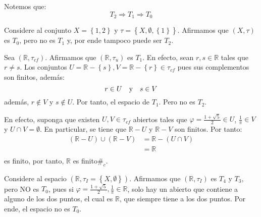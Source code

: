 \documentclass[12pt]{report}
\theoremstyle{largebreak}
\newcommand\contradiction{\ensuremath{\#_c}}
\begin{document}
    \begin{obs}
        Notemos que:
        \begin{equation*}
            T_2\Rightarrow T_1\Rightarrow T_0
        \end{equation*}
    \end{obs}

    \begin{exa}
        Considere al conjunto $X=\left\{1,2 \right\}$ y $\tau=\left\{X,\emptyset,\left\{1 \right\} \right\}$. Afirmamos que $(X,\tau)$ es $T_0$, pero no es $T_1$ y, por ende tampoco puede ser $T_2$.
    \end{exa}

    
    \begin{exa}
        Sea $(\mathbb{R},\tau_{cf})$. Afirmamos que $(\mathbb{R},\tau_u)$ es $T_1$. En efecto, sean $r,s\in\mathbb{R}$ tales que $r\neq s$. Los conjuntos $U=\mathbb{R}-\left\{s \right\},V=\mathbb{R}-\left\{r \right\}\in\tau_{cf}$ pues sus complementos son finitos, además:
        \begin{equation*}
            r\in U\quad\textup{y}\quad s\in V
        \end{equation*}
        además, $r\notin V$ y $s\notin U$. Por tanto, el espacio de $T_1$. Pero no es $T_2$.

        En efecto, suponga que existen $U,V\in\tau_{cf}$ abiertos tales que $\varphi=\frac{1+\sqrt{5}}{2}\in U$, $\frac{1}{\pi}\in V$ y $U\cap V=\emptyset$. En particular, se tiene que $\mathbb{R}-U$ y $\mathbb{R}-V$ son finitos. Por tanto:
        \begin{equation*}
            \begin{split}
                (\mathbb{R}-U)\cup(\mathbb{R}-V)&=\mathbb{R}-(U\cap V)\\
                &=\mathbb{R}\\
            \end{split}
        \end{equation*}
        es finito, por tanto, $\mathbb{R}$ es finito\contradiction.
    \end{exa}

    \begin{exa}
        Considere al espacio $(\mathbb{R},\tau_I=\left\{X,\emptyset \right\})$. Afirmamos que $(\mathbb{R},\tau_I)$ es $T_4$ y $T_3$, pero NO es $T_0$, pues si $\varphi=\frac{1+\sqrt{5}}{2},\frac{1}{\pi}\in\mathbb{R}$, solo hay un abierto que contiene a alguno de los dos puntos, el cual es $\mathbb{R}$, que siempre tiene a los dos puntos. Por ende, el espacio no es $T_0$.        
    \end{exa}
\end{document}
